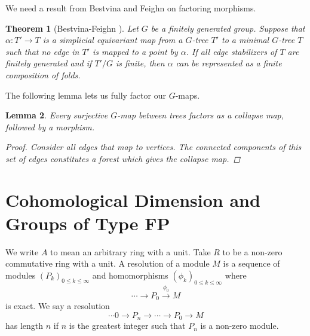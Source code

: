 \documentclass[12pt,parskip=full]{report}
\theoremstyle{plain}
\newtheorem{thm}{Theorem}[section]
\newtheorem{lem}[thm]{Lemma}
\theoremstyle{definition}
\begin{document}
We need a result from Bestvina and Feighn on factoring morphisms.
\begin{thm}[Bestvina-Feighn \cite{boundingcomplexity}]
    \label{thm:folds} 
    Let $G$ be a finitely generated group. Suppose that $\alpha: T'\to T$ is a simplicial equivariant map from a $G$-tree $T'$ to a minimal $G$-tree $T$ such that no edge in $T'$ is mapped to a point by $\alpha$. If all edge stabilizers of $T$ are finitely generated and if $T'/G$ is finite, then $\alpha$ can be represented as a finite composition of folds.
\end{thm}

The following lemma lets us fully factor our \(G\)-maps.
\begin{lem}
    \label{lem:gmapfactor}
    Every surjective \(G\)-map between trees factors as a collapse map, followed by a morphism.
    \begin{proof}
        Consider all edges that map to vertices. The connected components of this set of edges constitutes a forest which gives the collapse map.
    \end{proof}
\end{lem}












\section{Cohomological Dimension and Groups of Type FP}


We write \(A\) to mean an arbitrary ring with a unit. Take \(R\) to be a non-zero commutative ring with a unit. A resolution of a module \(M\) is a sequence of modules \((P_k)_{0\leq k\leq \infty}\) and homomorphisms \((\phi_k)_{0\leq k\leq \infty}\) where \[\cdots \to P_0 \overset{\phi_0}{\to} M\] is exact. We say a resolution \[\cdots 0\to P_n\to \cdots\to P_0 \to M\] has length \(n\) if \(n\) is the greatest integer such that \(P_n\) is a non-zero module.
\end{document}

